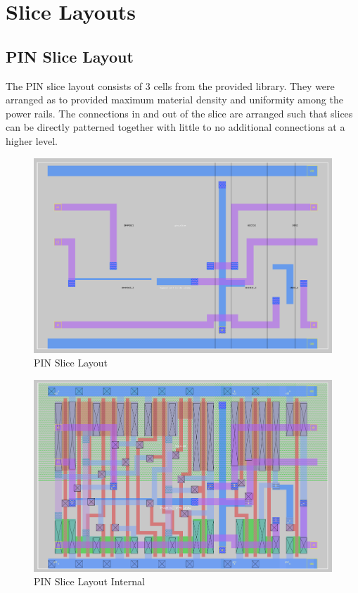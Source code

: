 \section{Slice Layouts}
    \subsection{PIN Slice Layout}
        The PIN slice layout consists of 3 cells from the provided library.
        They were arranged as to provided maximum material density and
        uniformity among the power rails.  The connections in and out of the
        slice are arranged such that slices can be directly patterned together
        with little to no additional connections at a higher level.
        \begin{figure}[H]
            \centering
            \includegraphics[width=0.75\linewidth]{../../magic/images/pin_slice.png}
            \caption{PIN Slice Layout}
        \end{figure}
        \begin{figure}[H]
            \centering
            \includegraphics[width=0.75\linewidth]{../../magic/images/pin_slice_internal.png}
            \caption{PIN Slice Layout Internal}
        \end{figure}
